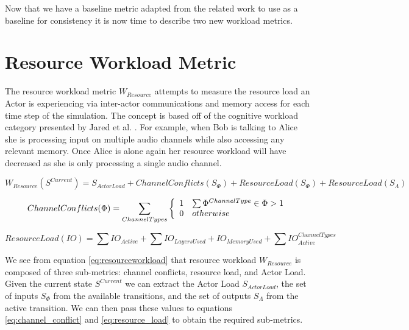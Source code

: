 Now that we have a baseline metric adapted from the related work to use as a baseline for consistency it is now time to describe two new workload metrics.

\section{Resource Workload Metric}

The resource workload metric $W_{Resource}$ attempts to measure the resource load an Actor is experiencing via inter-actor communications and memory access for each time step of the simulation.  The concept is based off of the cognitive workload category presented by Jared et al. \cite{moore2014modeling}.  For example, when Bob is talking to Alice she is processing input on multiple audio channels while also accessing any relevant memory.  Once Alice is alone again her resource workload will have decreased as she is only processing a single audio channel.

\begin{equation}
  W_{Resource}(S^{Current}) = S_{Actor Load} + ChannelConflicts(S_{\Phi}) + ResourceLoad(S_{\Phi}) + ResourceLoad(S_{\Lambda})
  \label{eq:resourceworkload}
\end{equation}

\begin{equation}
  ChannelConflicts(\Phi) = \sum_{ChannelTypes} \left\{
    \begin{array}{l l}
      1 & \sum \Phi^{ChannelType} \in \Phi > 1 \\
      0 & otherwise \\
    \end{array}
    \right.
  \label{eq:channel_conflict}
\end{equation}

\begin{equation}
  ResourceLoad(IO) = \sum IO_{Active} + \sum IO_{LayersUsed} + IO_{MemoryUsed} + \sum IO_{Active}^{ChannelTypes}
  \label{eq:resource_load}
\end{equation}

We see from equation \ref{eq:resourceworkload} that resource workload $W_{Resource}$ is composed of three sub-metrics: channel conflicts, resource load, and Actor Load.  Given the current state $S^{Current}$ we can extract the Actor Load $S_{Actor Load}$, the set of inputs $S_{\Phi}$ from the available transitions, and the set of outputs $S_{\Lambda}$ from the active transition.  We can then pass these values to equations \ref{eq:channel_conflict} and \ref{eq:resource_load} to obtain the required sub-metrics.

